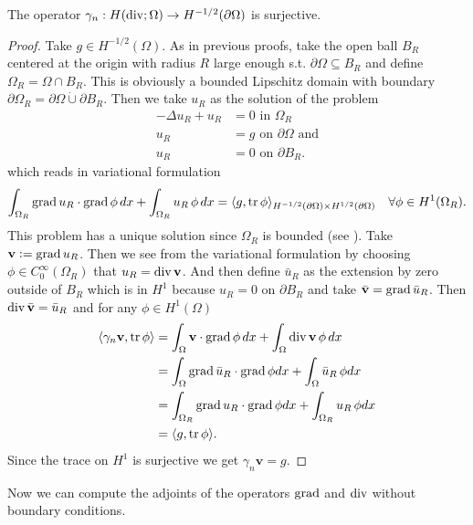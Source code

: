 \documentclass[../master_thesis.tex]{subfiles}
\begin{document}
\begin{theorem}
    The operator $\gamma_n: H(\operatorname{div}; \Omega) \rightarrow H^{-1/2}(\partial\Omega)$ 
    is surjective.
\end{theorem}
\begin{proof}
    Take $g \in H^{-1/2}(\Omega)$. As in previous proofs, take 
    the open ball $B_R$ centered at the origin with radius $R$ large enough 
    s.t. $\partial \Omega\subseteq B_R$ and define $\Omega_R = \Omega \cap B_R$.
    This is obviously a bounded Lipschitz domain with boundary 
    $\partial \Omega_R = \partial \Omega \dot{\cup} \partial B_R$.
    Then we take $u_R$ as the solution 
    of the problem 
    \begin{align*}
        -\Delta u_R + u_R &= 0 \text{ in $\Omega_R$} \\
        u_R &= g \text{ on $\partial \Omega$ and} 
        \\ u_R &= 0 \text{ on $\partial B_R$.} 
    \end{align*}
    which reads in variational formulation
    \begin{align*}
        \int_{\Omega_R} \operatorname{grad} u_R \cdot \operatorname{grad} \phi \, dx + \int_{\Omega_R} u_R \, \phi \,dx 
        = \langle g, \operatorname{tr} \phi \rangle_{H^{-1/2}(\partial \Omega) \times H^{1/2}(\partial \Omega)} \quad \forall \phi \in H^1(\Omega_R).
    \end{align*}
    This problem has a unique solution since $\Omega_R$ is bounded (see \cite[Thm. 3.12]{monk}).
    Take $\mathbf{v} \vcentcolon= \operatorname{grad} u_R$. Then we see from the variational 
    formulation by choosing $\phi \in C_0^\infty(\Omega_R)$ that $u_R = \operatorname{div} \mathbf{v}$.
    And then define $\bar{u}_R$ as the extension by zero outside of $B_R$ which is in $H^1$ 
    because $u_R = 0$ on $\partial B_R$ and take $\bar{\mathbf{v}} = \operatorname{grad} \bar{u}_R$. 
    Then $\operatorname{div} \bar{\mathbf{v}} = \bar{u}_R$
    and for any $\phi \in H^1(\Omega)$
    \begin{align*}
        \langle \gamma_n \mathbf{v}, \operatorname{tr} \phi \rangle 
        &= \int_\Omega \mathbf{v} \cdot \operatorname{grad} \phi \, dx 
            + \int_\Omega \operatorname{div} \mathbf{v} \, \phi \, dx
        \\ &= \int_\Omega \operatorname{grad} \bar{u}_R \cdot \operatorname{grad} \phi dx
            + \int_\Omega \bar{u}_R \, \phi dx 
        \\ &= \int_{\Omega_R} \operatorname{grad} u_R \cdot \operatorname{grad} \phi dx
            + \int_{\Omega_R} u_R \, \phi dx 
        \\ &= \langle g, \operatorname{tr} \phi \rangle.
    \end{align*}
    Since the trace on $H^1$ is surjective we get $\gamma_n \mathbf{v} = g$.
\end{proof}
Now we can compute the adjoints of the operators $\operatorname{grad}$ and $\operatorname{div}$ without boundary conditions.
\end{document}
